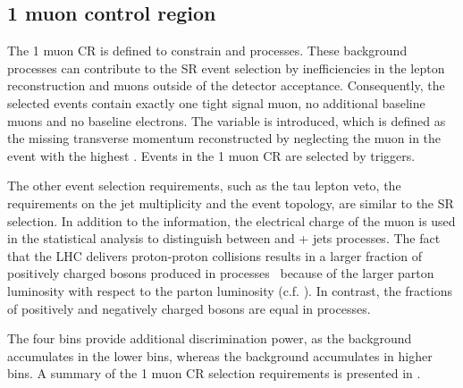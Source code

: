 \subsection{1 muon control region}
\label{sec:monoH:backgrounds:cr1}
The 1 muon CR is defined to constrain \wjets and \ttbar processes. These background processes can contribute to the SR event selection by inefficiencies in the lepton reconstruction and muons outside of the detector acceptance. Consequently, the selected events contain exactly one tight signal muon, no additional baseline muons and no baseline electrons. The variable \metnomu is introduced, which is defined as the missing transverse momentum reconstructed by neglecting the muon in the event with the highest \pt. Events in the 1 muon CR are selected by \met triggers.

The other event selection requirements, such as the tau lepton veto, the requirements on the jet multiplicity and the event topology, are similar to the SR selection. In addition to the \metnomu information, the electrical charge of the muon is used in the statistical analysis to distinguish between \ttbar and \PW  + jets processes.
The fact that the LHC delivers proton-proton collisions results in a larger fraction of positively charged \PWp bosons produced in \wjets processes~\cite{Kom2010} because of the larger \Pqu parton luminosity with respect to the \Pqd parton luminosity (c.f. ).
In contrast, the fractions of positively and negatively charged \PW bosons are equal in \ttbar processes.

The four \metnomu bins provide additional discrimination power, as the \ttbar background accumulates in the lower \metnomu bins, whereas the \wjets background accumulates in higher \metnomu bins.
A summary of the 1 muon CR selection requirements is presented in .

